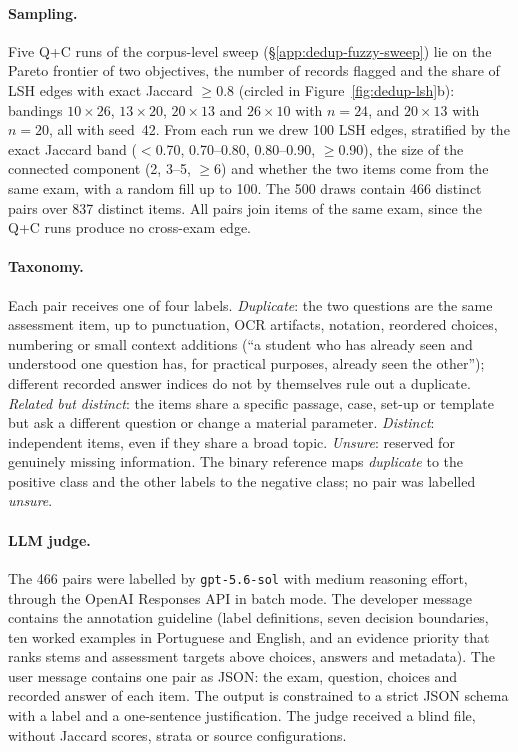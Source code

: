 \paragraph{Sampling.} Five Q+C runs of the corpus-level sweep
(\S\ref{app:dedup-fuzzy-sweep}) lie on the Pareto frontier of two objectives,
the number of records flagged and the share of LSH edges with exact Jaccard
$\ge 0.8$ (circled in Figure~\ref{fig:dedup-lsh}b): bandings
$10{\times}26$, $13{\times}20$, $20{\times}13$ and $26{\times}10$ with
$n=24$, and $20{\times}13$ with $n=20$, all with seed~42. From each run we
drew 100 LSH edges, stratified by the exact Jaccard band ($<$0.70,
0.70--0.80, 0.80--0.90, $\ge$0.90), the size of the connected component (2,
3--5, $\ge$6) and whether the two items come from the same exam, with a
random fill up to 100. The 500 draws contain 466 distinct pairs over 837
distinct items. All pairs join items of the same exam, since the Q+C runs
produce no cross-exam edge.

\paragraph{Taxonomy.} Each pair receives one of four labels. \emph{Duplicate}:
the two questions are the same assessment item, up to punctuation, OCR
artifacts, notation, reordered choices, numbering or small context additions
(``a student who has already seen and understood one question has, for
practical purposes, already seen the other''); different recorded answer
indices do not by themselves rule out a duplicate. \emph{Related but
distinct}: the items share a specific passage, case, set-up or template but
ask a different question or change a material parameter. \emph{Distinct}:
independent items, even if they share a broad topic. \emph{Unsure}: reserved
for genuinely missing information. The binary reference maps
\emph{duplicate} to the positive class and the other labels to the negative
class; no pair was labelled \emph{unsure}.

\paragraph{LLM judge.} The 466 pairs were labelled by \texttt{gpt-5.6-sol}
with medium reasoning effort, through the OpenAI Responses API in batch mode.
The developer message contains the annotation guideline (label definitions,
seven decision boundaries, ten worked examples in Portuguese and English, and
an evidence priority that ranks stems and assessment targets above choices,
answers and metadata). The user message contains one pair as JSON: the exam,
question, choices and recorded answer of each item. The output is constrained
to a strict JSON schema with a label and a one-sentence justification. The
judge received a blind file, without Jaccard scores, strata or source
configurations.

